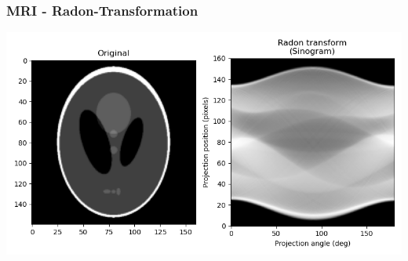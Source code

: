 %
%
%
\begin{frame}
\frametitle{MRI - Radon-Transformation}
\begin{center}
\includegraphics[width=\textwidth]{../slides/0/radon.png}
\end{center}

\end{frame}
